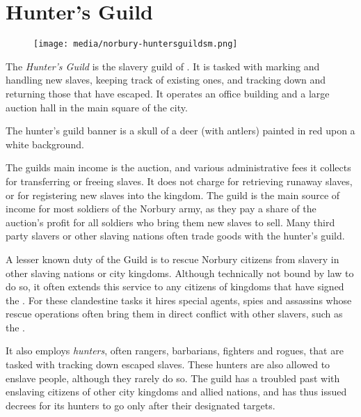 \section{Hunter's Guild}
\label{sec:Hunters Guild}

\begin{figure}[!ht]
  \centering
  \texttt{[image: media/norbury-huntersguildsm.png]}
\end{figure}

The \emph{Hunter's Guild} is the slavery guild of . It is
tasked with marking and handling new slaves, keeping track of existing ones,
and tracking down and returning those that have escaped. It operates an office
building and a large auction hall in the main square of the city.

The hunter's guild banner is a skull of a deer (with antlers) painted in red
upon a white background.

The guilds main income is the auction, and various administrative fees it
collects for transferring or freeing slaves. It does not charge for retrieving
runaway slaves, or for registering new slaves into the kingdom. The guild is
the main source of income for most soldiers of the Norbury army, as they pay a
share of the auction's profit for all soldiers who bring them new slaves to
sell. Many third party slavers or other slaving nations often trade goods with
the hunter's guild.

A lesser known duty of the Guild is to rescue Norbury citizens from slavery in
other slaving nations or city kingdoms. Although technically not bound by law
to do so, it often extends this service to any citizens of kingdoms that have
signed the . For these clandestine tasks it hires
special agents, spies and assassins whose rescue operations often bring them
in direct conflict with other slavers, such as the .

It also employs \emph{hunters}, often rangers, barbarians, fighters and
rogues, that are tasked with tracking down escaped slaves. These hunters are
also allowed to enslave people, although they rarely do so. The guild
has a troubled past with enslaving citizens of other city kingdoms and allied
nations, and has thus issued decrees for its hunters to go only after their
designated targets.

